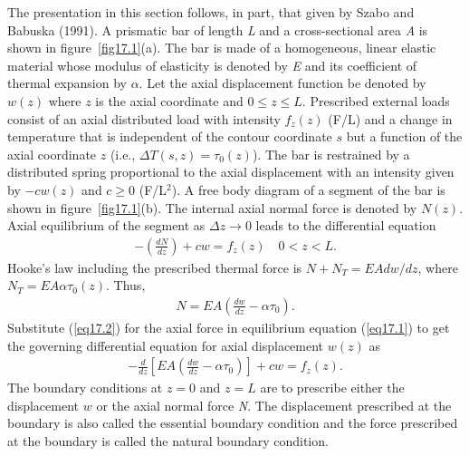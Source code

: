 \documentclass{AeroStructure-ERJohnson}
\begin{document}
The presentation in this section follows, in part, that given by Szabo and Babuska (1991). A prismatic bar of length \textit{L} and a cross-sectional area \textit{A} is shown in figure~\ref{fig17.1}(a). The bar is made of a homogeneous, linear elastic material whose modulus of elasticity is denoted by \textit{E} and its coefficient of thermal expansion by $\alpha$. Let the axial displacement function be denoted by $w(z)$ where $z$ is the axial coordinate and $0 \leq z \leq L$. Prescribed external loads consist of an axial distributed load with intensity $f_{z}(z)$ (F/L) and a change in temperature that is independent of the contour coordinate $s$ but a function of the axial coordinate $z$ (i.e., $\Delta T(s, z)=\tau_{0}(z)$). The bar is restrained by a distributed spring proportional to the axial displacement with an intensity given by $-c w(z)$ and $c \geq 0$ (F/L$^2$). A free body diagram of a segment of the bar is shown in figure~\ref{fig17.1}(b). The internal axial normal force is denoted by $N(z)$. Axial equilibrium of the segment as $\Delta z \rightarrow 0$ leads to the differential equation
\begin{align}\label{eq17.1}
-\left(\frac{d N}{d z}\right)+c w=f_{z}(z) \quad 0<z<L.
\end{align}
Hooke's law including the prescribed thermal force is $N+N_{T}=E A d w/d z$, where $N_{T}=E A \alpha \tau_{0}(z)$. Thus,
\begin{align}\label{eq17.2}
N=E A\left(\frac{d w}{d z}-\alpha \tau_{0}\right).
\end{align}
Substitute (\ref{eq17.2}) for the axial force in equilibrium equation (\ref{eq17.1}) to get the governing differential equation for axial displacement $w(z)$ as
\begin{align}\label{eq17.3}
-\frac{d}{d z}\left[E A\left(\frac{d w}{d z}-\alpha \tau_{0}\right)\right]+c w=f_{z}(z).
\end{align}
The boundary conditions at $z=0$ and $z=L$ are to prescribe either the displacement $w$ or the axial normal force \textit{N}. The displacement prescribed at the boundary is also called the essential boundary condition and the force prescribed at the boundary is called the natural boundary condition.
\end{document}
